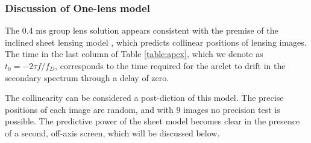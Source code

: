 \documentclass[useAMS,usenatbib]{mn2e}
\begin{document}



\subsubsection{Discussion of One-lens model}
\label{222}
The $0.4$ ms group lens solution appears consistent with the premise
of the inclined sheet lensing model \citep{2014MNRAS.442.3338P}, which
predicts collinear positions of lensing images.  The time in the last
column of Table \ref{table:apex}, which we denote as $t_0
=-2{\tau}f/{f_{D}}$, corresponds to the time required 
for the arclet to drift in the secondary spectrum through a delay of zero.

The collinearity can be considered a post-diction of this model.  The
precise positions of each image are random, and with 9 images no
precision test is possible.  The predictive power of the sheet model
becomes clear in the presence of a second, off-axis screen, which will be discussed below.


\end{document}
